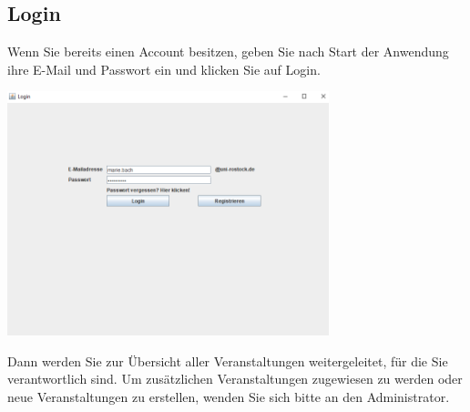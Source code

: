 \documentclass{Handbuch}
\begin{document}
\subsection{Login}
Wenn Sie bereits einen Account besitzen, geben Sie nach Start der Anwendung ihre E-Mail und Passwort ein und klicken Sie auf \frqq Login\flqq. 
\begin{center}
	\includegraphics[width=0.7\textwidth]{img_DozentenGUI_05.png}
\end{center}Dann werden Sie zur Übersicht aller Veranstaltungen weitergeleitet, für die Sie verantwortlich sind. Um zusätzlichen Veranstaltungen zugewiesen zu werden oder neue Veranstaltungen zu erstellen, wenden Sie sich bitte an den Administrator.
\end{document}

